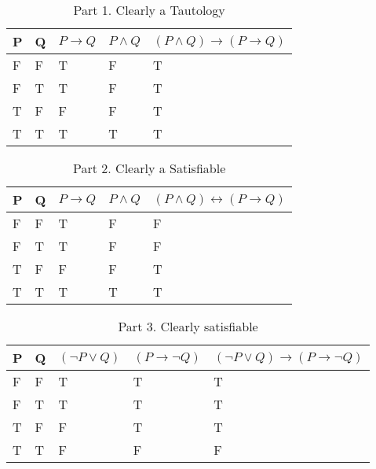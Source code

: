 \documentclass[10.5pt]{article}
\newenvironment{solution}[2][Solution]{ \begin{trivlist}
\item[\hskip \labelsep {\bfseries #1}]}{\end{trivlist}}
\begin{document}
\begin{solution}{2}
\item[]
\begin{table}[!h]
\centering
\caption{Part 1. Clearly a Tautology}
\label{my-label}
\begin{tabular}{|l|l|l|l|l|}
\hline
P & Q & $P \rightarrow Q$ & $P \wedge Q$ & $(P \wedge Q) \rightarrow (P \rightarrow Q)$ \\ \hline
F & F & T               & F          & T                                          \\ \hline
F & T & T               & F          & T                                          \\ \hline
T & F & F               & F          & T                                          \\ \hline
T & T & T               & T          & T                                          \\ \hline
\end{tabular}
\end{table}

\begin{table}[!h]
\centering
\caption{Part 2. Clearly a Satisfiable}
\label{my-label}
\begin{tabular}{|l|l|l|l|l|}
\hline
P & Q & $P \rightarrow Q$ & $P \wedge Q$ & $(P \wedge Q) \leftrightarrow (P \rightarrow Q)$ \\ \hline
F & F & T               & F          & F                                          \\ \hline
F & T & T               & F          & F                                          \\ \hline
T & F & F               & F          & T                                          \\ \hline
T & T & T               & T          & T                                          \\ \hline
\end{tabular}
\end{table}

\begin{table}[!h]
\centering
\caption{Part 3. Clearly satisfiable}
\label{my-label}
\begin{tabular}{|l|l|l|l|l|}
\hline
P & Q & $(\lnot P \vee Q)$ & $(P \rightarrow \lnot Q)$ & $(\lnot P \vee Q) \rightarrow (P \rightarrow \lnot Q)$ \\ \hline
F & F & T & T & T \\ \hline
F & T & T & T & T \\ \hline
T & F & F & T & T \\ \hline
T & T & F & F & F \\ \hline
\end{tabular}
\end{table}


\end{solution}
\end{document}
